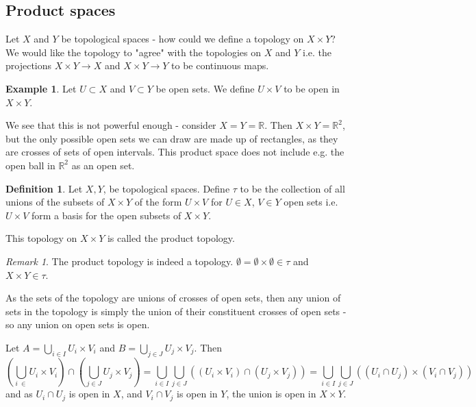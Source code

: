 \documentclass{article}
\theoremstyle{definition}
\newtheorem{defn}{Definition}[section]
\newtheorem{exmp}{Example}[section]
\theoremstyle{plain}%
\theoremstyle{remark}
\newtheorem*{rem}{Remark}
\newcommand{\Union}{\bigcup}
\newcommand{\intersection}{\cap}
\newcommand{\cross}{\times}
\newcommand{\R}{\mathbb{R}}
\begin{document}
\subsection{Product spaces}

Let $X$ and $Y$ be topological spaces - how could we define a topology on $X \cross Y$? We would like the topology to "agree" with the topologies on $X$ and $Y$ i.e. the projections $X \cross Y \to X$ and $X \cross Y \to Y$ to be continuous maps.

\begin{exmp}
    Let $U \subset X$ and $V \subset Y$ be open sets. We define $U \cross V$ to be open in $X \cross Y$.

    We see that this is not powerful enough - consider $X = Y = \R$. Then $X \cross Y = \R^2$, but the only possible open sets we can draw are made up of rectangles, as they are crosses of sets of open intervals. This product space does not include e.g. the open ball in $\R^2$ as an open set.
\end{exmp}

\begin{defn}
    Let $X, Y$, be topological spaces. Define $\tau$ to be the collection of all unions of the subsets of $X \cross Y$ of the form $U \cross V$ for $U \in X$, $V \in Y$ open sets i.e. $U \times V$ form a basis for the open subsets of $X \times Y$.

    This topology on $X \cross Y$ is called the product topology.
\end{defn}

\begin{rem}
    The product topology is indeed a topology. $\emptyset = \emptyset \cross \emptyset \in \tau$ and $X \cross Y \in \tau$.

    As the sets of the topology are unions of crosses of open sets, then any union of sets in the topology is simply the union of their constituent crosses of open sets - so any union on open sets is open.

    Let $A = \Union_{i \in I} U_i \cross V_i$ and $B = \Union_{j \in J} U_j \cross V_j$. Then
    \[\left(\Union_{i\ \in } U_i \cross V_i\right) \intersection \left( \Union_{j \in J} U_j \cross V_j \right) = \Union_{i \in I} \Union_{j \in J} \left( (U_i \cross V_i) \intersection (U_j \cross V_j) \right) = \Union_{i \in I}\Union_{j \in J} \left( (U_i \intersection U_j) \cross (V_i \intersection V_j) \right) \]
    and as $U_i \intersection U_j$ is open in $X$, and $V_i \intersection V_j$ is open in $Y$, the union is open in $X \cross Y$.
\end{rem}
\end{document}
